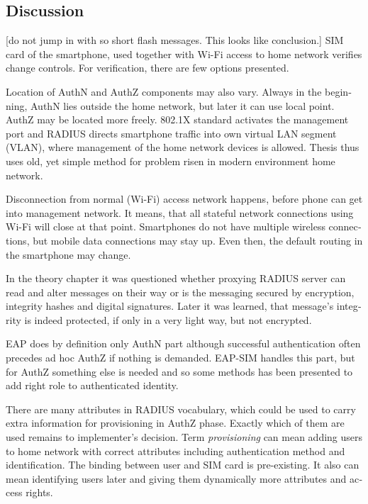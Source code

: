 \documentclass[12pt,a4paper,english]{tutthesis}
\begin{document}
\begin{otherlanguage}{english}
\section{Discussion}
\label{sec-6-5}


[do not jump in with so short flash messages. This looks like conclusion.] 
SIM card of the smartphone, used together with Wi-Fi access to home network 
verifies change controls. For verification, there are few options presented.

Location of AuthN and AuthZ components may also vary.
Always in the beginning, AuthN lies outside the home network, but
later it can use local point. AuthZ may be located more freely.
802.1X standard activates the management port and
RADIUS directs smartphone traffic into own virtual LAN segment (VLAN),
where management of the home network devices is allowed.
Thesis thus uses old, yet simple method for problem risen in modern environment home network.

Disconnection from normal (Wi-Fi) access network happens, before phone can get
into management network. It means, that all stateful network
connections using Wi-Fi will close at that point. Smartphones do not
have multiple wireless connections, but mobile data connections may 
stay up. Even then, the default routing in the smartphone may change.

In the theory chapter it was questioned whether proxying RADIUS server
can read and alter messages on their way or is the messaging secured
by encryption, integrity hashes and digital signatures.
Later it was learned, that message's integrity is indeed protected, if
only in a very light way, but not encrypted.


EAP does by definition only AuthN part although successful
authentication often precedes ad hoc AuthZ if nothing is demanded.
EAP-SIM handles this part, but for AuthZ something else is needed
and so some methods has been presented to add right role to 
authenticated identity.

There are many attributes in RADIUS vocabulary, which could be 
used to carry extra information for provisioning in AuthZ phase. Exactly which
of them are used remains to implementer's  decision.
Term \emph{provisioning} can mean adding users to home network with correct
attributes including authentication method and identification.
The binding between user and SIM card is pre-existing.
It also can mean identifying users later and giving them 
dynamically more attributes and access rights.


\end{otherlanguage}
\end{document}
